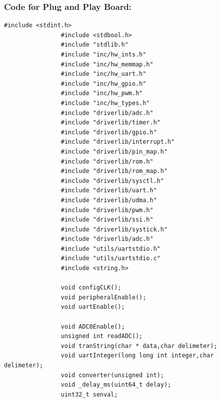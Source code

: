 \documentclass[a4paper,12pt,oneside]{article}
\begin{document}
			\subsubsection{\textbf{Code for Plug and Play Board:}}
			\begin{lstlisting}[style=CStyle]
				#include <stdint.h>
				#include <stdbool.h>
				#include "stdlib.h"
				#include "inc/hw_ints.h"
				#include "inc/hw_memmap.h"
				#include "inc/hw_uart.h"
				#include "inc/hw_gpio.h"
				#include "inc/hw_pwm.h"
				#include "inc/hw_types.h"
				#include "driverlib/adc.h"
				#include "driverlib/timer.h"
				#include "driverlib/gpio.h"
				#include "driverlib/interrupt.h"
				#include "driverlib/pin_map.h"
				#include "driverlib/rom.h"
				#include "driverlib/rom_map.h"
				#include "driverlib/sysctl.h"
				#include "driverlib/uart.h"
				#include "driverlib/udma.h"
				#include "driverlib/pwm.h"
				#include "driverlib/ssi.h"
				#include "driverlib/systick.h"
				#include "driverlib/adc.h"
				#include "utils/uartstdio.h"
				#include "utils/uartstdio.c"
				#include <string.h>
				
				void configCLK();
				void peripheralEnable();
				void uartEnable();
				
				void ADC0Enable();
				unsigned int readADC();
				void tranString(char * data,char delimeter);
				void uartInteger(long long int integer,char delimeter);
				void converter(unsigned int);
				void _delay_ms(uint64_t delay);
				uint32_t senval;


\end{lstlisting}
\end{document}
